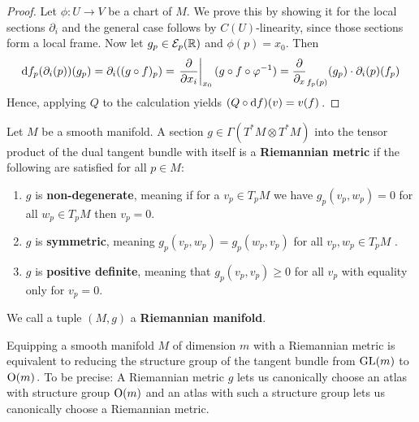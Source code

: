 		\begin{proof}Let $\phi:U \to V$ be a chart of $M$. 
			We prove this by showing it for the local sections $\partial_i$ and the general case follows by $C(U)$-linearity, since those sections form a local frame. Now let $g_p\in \mathcal{E}_p(\mathbb{R})$ and $\phi(p)=x_0$. Then
		\begin{equation*}
		\mathop{}\!\mathrm{d} f _p(\partial_i(p))(g_p)= 
		\partial_i((g\circ f)_p)
		=\left.\frac{\partial }{\partial x_i}\right|_{x_0}(g\circ f\circ \varphi^{-1})
		=\frac{\partial}{\partial_x}_{f_p(p)}(g_p) \cdot  \partial_i(p)(f_p)
		\end{equation*}
		Hence, applying $Q$ to the calculation yields $(Q\circ \mathop{}\!\mathrm{d} f)(v)=v(f)$\,.
	\end{proof}
	
	
\begin{definition}[A Metric]
	Let $M$ be a smooth manifold.
	A section $g\in \Gamma(T^*M\otimes T^*M)$ into the tensor product of the dual tangent bundle with itself is a \textbf{Riemannian metric} if the following are satisfied for all $p\in M$:
	\begin{enumerate}
		\item $g$ is \textbf{non-degenerate}, meaning if for a $v_p\in T_pM$ we have $g_p(v_p,w_p)=0$ for all $w_p\in T_pM$ then $v_p=0$.
		\item $g$ is \textbf{symmetric}, meaning $g_p(v_p,w_p)=g_p(w_p,v_p)$ for all $ v_p,w_p\in T_pM$ .
		\item $g$ is \textbf{positive definite}, meaning that $g_p(v_p,v_p)\geq 0 $ for all $v_p$ with equality only for $v_p=0$.
	\end{enumerate} We call a tuple $(M,g)$ a \textbf{Riemannian manifold}.
\end{definition}
\begin{remark}
	Equipping a smooth manifold $M$ of dimension $m$ with a Riemannian metric is equivalent to reducing the structure group of the tangent bundle from $\mathrm{GL}(m)$ to $\operatorname{\mathrm{O}}(m)\,.$
	To be precise: A Riemannian metric $g$ lets us canonically choose an atlas with structure group $\operatorname{\mathrm{O}}(m)$ and an atlas with such a structure group lets us canonically choose a Riemannian metric. 
\end{remark}
